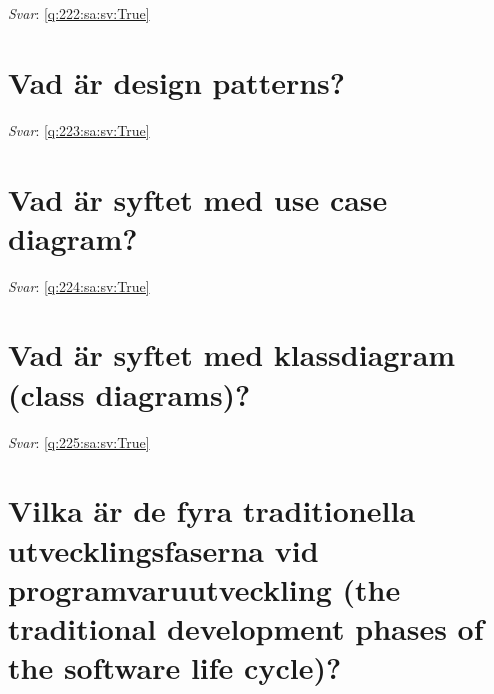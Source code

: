 \documentclass[a4paper,11pt,oneside]{book}
\begin{document}
\begin{sloppypar}
\textit{Svar}: \autoref{q:222:sa:sv:True}



\section{Vad \"ar design patterns?}

\label{q:223:sa:sv:False}

\vspace{2cm}

\noindent\makebox[\textwidth]{\hrulefill}

\vspace{1cm}

\textit{Svar}: \autoref{q:223:sa:sv:True}



\section{Vad \"ar syftet med use case diagram?}

\label{q:224:sa:sv:False}

\vspace{2cm}

\noindent\makebox[\textwidth]{\hrulefill}

\vspace{1cm}

\textit{Svar}: \autoref{q:224:sa:sv:True}



\section{Vad \"ar syftet med klassdiagram (class diagrams)?}

\label{q:225:sa:sv:False}

\vspace{2cm}

\noindent\makebox[\textwidth]{\hrulefill}

\vspace{1cm}

\textit{Svar}: \autoref{q:225:sa:sv:True}



\section{Vilka \"ar de fyra traditionella utvecklingsfaserna vid programvaruutveckling (the traditional development phases of the software life cycle)?}


\end{sloppypar}
\end{document}
